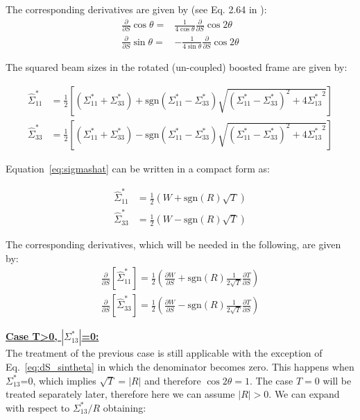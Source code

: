 The corresponding derivatives are given by (see Eq. 2.64 in \cite{refpaper}):
\begin{align}
\frac{\partial }{\partial S} \cos \theta =& \frac{1}{4 \cos \theta} \frac{\partial }{\partial S} \cos 2\theta \\
\frac{\partial }{\partial S} \sin \theta =& -\frac{1}{4 \sin \theta} \frac{\partial }{\partial S} \cos 2\theta \label{eq:dS_sintheta}
\end{align}

The squared beam sizes in the rotated (un-coupled) boosted frame are given by:

\begin{align}
\hat{\Sigma}^*_{11} &= \frac{1}{2}\left[ \left(\Sigma^*_{11} + \Sigma^*_{33}\right) +\textrm{sgn}\left(\Sigma^*_{11} - \Sigma^*_{33}\right)\sqrt{\left(\Sigma^*_{11} - \Sigma^*_{33}\right)^2 + 4 {\Sigma^*_{13}}^2 }\right] \\
\hat{\Sigma}^*_{33} &= \frac{1}{2}\left[ \left(\Sigma^*_{11} + \Sigma^*_{33}\right) -\textrm{sgn}\left(\Sigma^*_{11} - \Sigma^*_{33}\right)\sqrt{\left(\Sigma^*_{11} - \Sigma^*_{33}\right)^2 + 4 {\Sigma^*_{13}}^2 }\right] 
\label{eq:sigmashat}
\end{align}


Equation~\ref{eq:sigmashat} can be written in a compact form as:

\begin{align}
\hat{\Sigma}^*_{11} &= \frac{1}{2}\left(W + \textrm{sgn}(R)\sqrt{T} \right)\\
\hat{\Sigma}^*_{33} &= \frac{1}{2}\left(W - \textrm{sgn}(R)\sqrt{T} \right) \label{eq:Sigmashat}
\end{align}

The corresponding derivatives, which will be needed in the following, are given by:
\begin{align}
\frac{\partial }{\partial S} \left[\hat{\Sigma}^*_{11} \right] = \frac{1}{2}\left(\frac{\partial W}{\partial S} + \textrm{sgn}(R)\frac{1}{2\sqrt{T}}\frac{\partial T}{\partial S}  \right)\\
\frac{\partial }{\partial S} \left[\hat{\Sigma}^*_{33} \right] = \frac{1}{2}\left(\frac{\partial W}{\partial S} - \textrm{sgn}(R)\frac{1}{2\sqrt{T}}\frac{\partial T}{\partial S}  \right)\label{eq:dS_Sigmas}
\end{align}

\textbf{\underline{Case T>0, $\left|\Sigma^*_{13}\right|$=0:}}
~\\

The treatment of the previous case is still applicable with the exception of Eq.~\ref{eq:dS_sintheta} in which the denominator becomes zero.
This happens when $\Sigma^*_{13}$=0, which implies $\sqrt{T}=\left| R \right|$ and therefore $\cos 2 \theta = 1$. The case $T=0$ will be treated separately later, therefore here we can assume $\left| R \right|>0$. We can expand with respect to ${\Sigma^*_{13}}/{R}$ obtaining:

